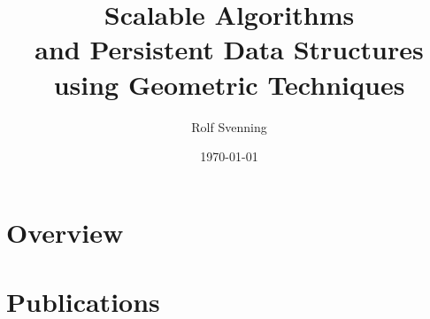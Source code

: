 \documentclass[11pt,a4paper,twoside,openright,oldfontcommands]{memoir} %
\title{Scalable Algorithms \\ and Persistent Data Structures \\ using Geometric Techniques }
\author{Rolf Svenning}
\date{\today}
\begin{document}


\frontmatter


\cleardoublepage
\tableofcontents
\cleardoublepage

\mainmatter
{}


\part{Overview}
\label{part:overview}










\part{Publications}
\label{part:publications}



\backmatter



\cleardoublepage
 

\end{document}
